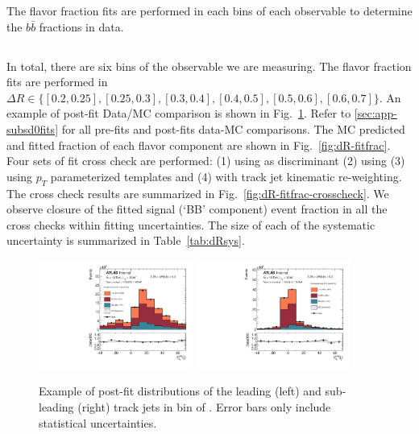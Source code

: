 \label{sec:gbb-bkgres}

The flavor fraction fits are performed in each bins of each observable to determine the $b\bar b $ fractions in data. 

\subsection{\drbb}

In total, there are six bins of the \drbb observable we are measuring. The flavor fraction fits are performed in $\Delta R \in\{[0.2, 0.25], [0.25, 0.3], [0.3, 0.4], [0.4,0.5], [0.5,0.6], [0.6,0.7]\}$. An example of post-fit Data/MC comparison is shown in Fig.~\ref{fig:dR-fit-example}. Refer to \ref{sec:app-subsd0fits} for all pre-fits and post-fits data-MC comparisons. The MC predicted and fitted fraction of each flavor component are shown in Fig.~\ref{fig:dR-fitfrac}. Four sets of fit cross check are performed: (1) using \sdzero as discriminant (2) using \subsubsdzero (3) using $p_T$ parameterized templates and (4) with track jet kinematic re-weighting. The cross check results are summarized in Fig.~\ref{fig:dR-fitfrac-crosscheck}. We observe closure of the fitted signal (`BB' component) event fraction in all the cross checks within fitting uncertainties. The size of each of the systematic uncertainty is summarized in Table~\ref{tab:dRsys}.

\begin{figure}[htbp]
  \centering
 \includegraphics[width=0.45\textwidth]{figures/gbb/paperplots/Canv_Fit_dR_LpT_INF_SpT_INF_coarse_x}
 \includegraphics[width=0.45\textwidth]{figures/gbb/paperplots/Canv_Fit_b0_25_DeltaR_0_3_LpT_INF_SpT_INF_coarse_y}
\caption{Example of post-fit \subsdzero distributions of the leading (left) and sub-leading (right) track jets in bin of \drbb. Error bars only include statistical uncertainties.}
  \label{fig:dR-fit-example}
\end{figure}

